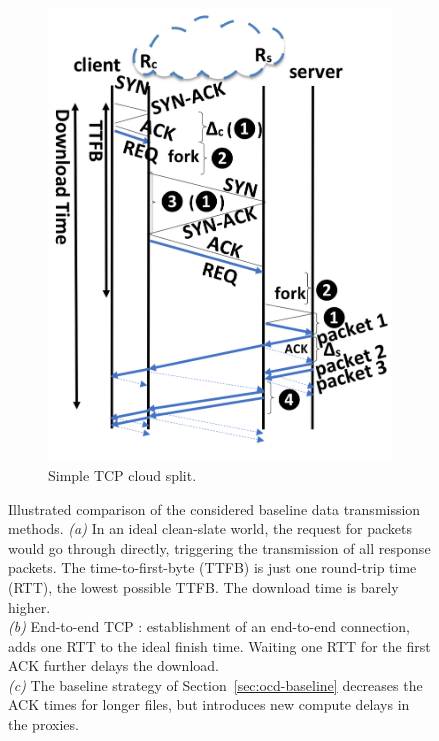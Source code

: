 \documentclass[newfonts=false,format=sigconf,anonymous,10pt,letterpaper]{acmart}
\begin{document}
\begin{figure}[!t]
\begin{subfigure}{0.65\columnwidth}
  \includegraphics[width=\columnwidth,clip]{figures/split.png}
    \caption{Simple TCP cloud split.} \label{fig:baseline}
\end{subfigure}
    \caption{Illustrated comparison of the considered baseline data transmission methods. 
    \textit{(a)} In an ideal clean-slate world, the request for packets would go through directly, triggering the transmission of all response packets. The time-to-first-byte (TTFB) is just one round-trip time (RTT), the lowest possible TTFB. The download time is barely higher.\\ \textit{(b)} End-to-end TCP :
    establishment of an end-to-end connection, adds one RTT to the ideal finish time. Waiting one RTT for the first ACK further delays the download. \\ \textit{(c)} The baseline strategy of Section~\ref{sec:ocd-baseline} decreases the ACK times for longer files, but introduces new compute delays in the proxies. 
}
\end{figure}
\end{document}
